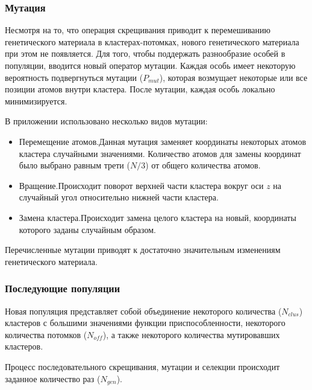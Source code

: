 \subsubsection {Мутация}

Несмотря на то, что операция скрещивания приводит к перемешиванию генетического материала
в кластерах-потомках, нового генетического материала при этом не появляется. Для того, чтобы
поддержать разнообразие особей в популяции, вводится новый оператор мутации. Каждая особь
имеет некоторую вероятность подвергнуться мутации ($P_{mut}$), которая возмущает некоторые или
все позиции атомов внутри кластера. После мутации, каждая особь локально минимизируется.

В приложении использовано несколько видов мутации:

\begin{itemize}
  \item{Перемещение атомов.Данная мутация заменяет координаты некоторых атомов кластера
случайными значениями. Количество атомов для замены координат было выбрано равным
трети ($N/3$) от общего количества атомов.}
\item{Вращение.Происходит поворот верхней части кластера вокруг оси $z$ на случайный угол
  относительно нижней части кластера.}
\item{Замена кластера.Происходит замена целого кластера на новый, координаты которого заданы
  случайным образом.} 
\end{itemize}

Перечисленные мутации приводят к достаточно значительным изменениям генетического материала.


\subsubsection {Последующие популяции}

Новая популяция представляет собой объединение некоторого количества ($N_{clus}$) кластеров
с большими значениями функции приспособленности, некоторого количества потомков ($N_{off}$),
а также некоторого количества мутировавших кластеров.

Процесс последовательного скрещивания, мутации и селекции происходит заданное количество
раз ($N_{gen}$).
